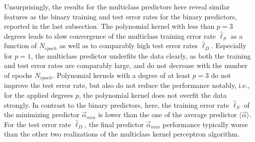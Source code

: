 Unsurprisingly, the results for the multiclass predictors here reveal similar features as the binary training and test error rates for the binary predictors, reported in the last subsection. The polynomial kernel with less than $p = 3$ degrees leads to slow convergence of the multiclass training error rate $\hat{\ell}_S$ as a function of $N_{epoch}$ as well as to comparably high test error rates $\hat{\ell}_D$. Especially for $p=1$, the multiclass predictor underfits the data clearly, as both the training and test error rates are comparably large, and do not decrease with the number of epochs $N_{epoch}$. Polynomial kernels with a degree of at least $p=3$ do not improve the test error rate, but also do not reduce the performance notably, i.e., for the applied degrees $p$, the polynomial kernel does not overfit the data strongly. In contrast to the binary predictors, here, the training error rate $\hat{\ell}_S$ of the minimizing predictor $\vec{\alpha}_{min}$ is lower than the one of the average predictor $\langle\vec{\alpha}\rangle$. For the test error rate $\hat{\ell}_D$, the final predictor $\vec{\alpha}_{min}$ performance typically worse than the other two realizations of the multiclass kernel perceptron algorithm.


